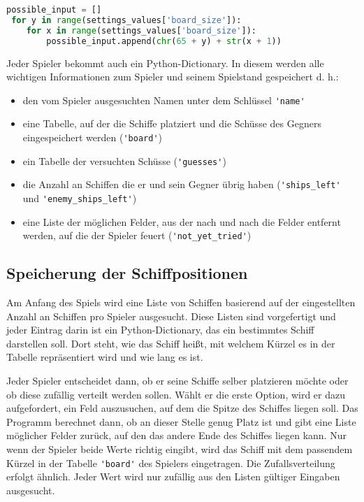 \documentclass{article}
\begin{document}
\begin{lstlisting}[language=Python, caption = Herstellung einer Liste aller möglichen Felder, label=lst:possible input]
 possible_input = []
 for y in range(settings_values['board_size']):
    for x in range(settings_values['board_size']):
        possible_input.append(chr(65 + y) + str(x + 1))
\end{lstlisting}

    Jeder Spieler bekommt auch ein Python-Dictionary. In diesem werden alle wichtigen Informationen zum Spieler und seinem Spielstand gespeichert d. h.:

\setlist{}%
\begin{itemize}
\itemsep0em
  \item den vom Spieler ausgesuchten Namen unter dem Schlüssel \verb$'name'$
  \item eine Tabelle, auf der die Schiffe platziert und die Schüsse des Gegners eingespeichert werden (\verb$'board'$)
  \item ein Tabelle der versuchten Schüsse (\verb$'guesses'$)
  \item die Anzahl an Schiffen die er und sein Gegner übrig haben (\verb$'ships_left'$ und \verb$'enemy_ships_left'$)
  \item eine Liste der möglichen Felder, aus der nach und nach die Felder entfernt werden, auf die der Spieler feuert (\verb$'not_yet_tried'$)
\end{itemize}

\subsection{Speicherung der Schiffpositionen}
    Am Anfang des Spiels wird eine Liste von Schiffen basierend auf der eingestellten Anzahl an Schiffen pro Spieler ausgesucht. Diese Listen sind vorgefertigt und jeder Eintrag darin ist ein Python-Dictionary, das ein bestimmtes Schiff darstellen soll. Dort steht, wie das Schiff heißt, mit welchem Kürzel es in der Tabelle repräsentiert wird und wie lang es ist.\\

\par
    Jeder Spieler entscheidet dann, ob er seine Schiffe selber platzieren möchte oder ob diese zufällig verteilt werden sollen. Wählt er die erste Option, wird er dazu aufgefordert, ein Feld auszusuchen, auf dem die Spitze des Schiffes liegen soll. Das Programm berechnet dann, ob an dieser Stelle genug Platz ist und gibt eine Liste möglicher Felder zurück, auf den das andere Ende des Schiffes liegen kann. Nur wenn der Spieler beide Werte richtig eingibt, wird das Schiff mit dem passendem Kürzel in der Tabelle \verb$'board'$ des Spielers eingetragen. Die Zufallsverteilung erfolgt ähnlich. Jeder Wert wird nur zufällig aus den Listen gültiger Eingaben ausgesucht.
\end{document}
